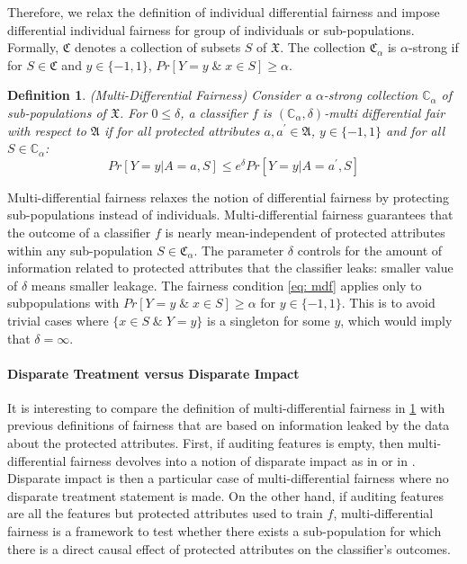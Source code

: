 \documentclass{article}
\newtheorem{defn}{Definition}[section]
\begin{document}
\bigskip
Therefore, we relax the definition of individual differential fairness and impose differential individual fairness for group of individuals or sub-populations. Formally, $\mathfrak{C}$ denotes a collection of subsets $S$ of $\mathfrak{X}$. The collection $\mathfrak{C}_{\alpha}$ is $\alpha$-strong if for $S\in \mathfrak{C}$ and $y\in \{-1, 1\}$, $Pr[Y=y \;\&\; x\in S] \geq \alpha$.  

\begin{defn}(Multi-Differential Fairness)
\label{def: mdf}
Consider a $\alpha$-strong collection $\mathbb{C}_{\alpha}$ of sub-populations of $\mathfrak{X}$. For $0\leq \delta$, a classifier $f$ is $(\mathbb{C}_{\alpha}, \delta)$-multi differential fair with respect to $\mathfrak{A}$ if for all protected attributes $a, a^{'}\in \mathfrak{A}$, $y\in\{-1, 1\}$ and for all $S\in \mathbb{C}_{\alpha}$:
\begin{equation}
\label{eq: mdf}
Pr[Y=y|A=a, S] \leq e^{\delta} Pr[Y=y|A=a^{'}, S]
\end{equation}
\end{defn}

Multi-differential fairness relaxes the notion of differential fairness by protecting sub-populations instead of individuals. Multi-differential fairness guarantees that the outcome of a classifier $f$ is nearly mean-independent of protected attributes within any sub-population $S\in \mathfrak{C}_{\alpha}$. The parameter $\delta$ controls for the amount of information related to protected attributes that the classifier leaks: smaller value of $\delta$ means smaller leakage. The fairness condition \ref{eq: mdf} applies only to subpopulations with $Pr[Y=y \;\&\; x\in S] \geq \alpha$ for $y\in\{-1, 1\}$. This is to avoid trivial cases where $\{x\in S \; \& \; Y=y\}$ is a singleton for some $y$, which would imply that $\delta=\infty$. 

\paragraph{Disparate Treatment versus Disparate Impact}
It is interesting to compare the definition of multi-differential fairness in \ref{def: mdf} with previous definitions of fairness that are based on information leaked by the data about the protected attributes.  First, if auditing features is empty, then multi-differential fairness devolves into a notion of disparate impact as in \cite{feldman2015certifying} or in \cite{chouldechova2017fair}. Disparate impact is then a particular case of multi-differential fairness where no disparate treatment  statement is made. On the other hand, if auditing features are all the features but protected attributes used to train $f$, multi-differential fairness is a framework to test whether there exists a sub-population for which there is a direct causal effect of protected attributes on the classifier's outcomes. 
\end{document}
